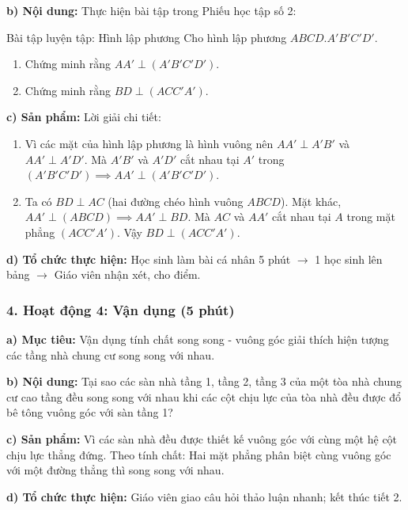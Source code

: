 \documentclass[12pt, a4paper]{article}
\begin{document}
\noindent \textbf{b) Nội dung:}
Thực hiện bài tập trong Phiếu học tập số 2:
\begin{pedabox}{Bài tập luyện tập: Hình lập phương}
Cho hình lập phương $ABCD.A'B'C'D'$.
\begin{enumerate}[leftmargin=0.6cm]
    \item Chứng minh rằng $AA' \perp (A'B'C'D')$.
    \item Chứng minh rằng $BD \perp (ACC'A')$.
\end{enumerate}
\end{pedabox}

\noindent \textbf{c) Sản phẩm:}
Lời giải chi tiết:
\begin{enumerate}[leftmargin=0.6cm]
    \item Vì các mặt của hình lập phương là hình vuông nên $AA' \perp A'B'$ và $AA' \perp A'D'$. Mà $A'B'$ và $A'D'$ cắt nhau tại $A'$ trong $(A'B'C'D') \implies AA' \perp (A'B'C'D')$.
    \item Ta có $BD \perp AC$ (hai đường chéo hình vuông $ABCD$).
    Mặt khác, $AA' \perp (ABCD) \implies AA' \perp BD$.
    Mà $AC$ và $AA'$ cắt nhau tại $A$ trong mặt phẳng $(ACC'A')$.
    Vậy $BD \perp (ACC'A')$.
\end{enumerate}

\noindent \textbf{d) Tổ chức thực hiện:}
Học sinh làm bài cá nhân 5 phút $\to$ 1 học sinh lên bảng $\to$ Giáo viên nhận xét, cho điểm.

\subsubsection*{4. Hoạt động 4: Vận dụng (5 phút)}

\noindent \textbf{a) Mục tiêu:}
Vận dụng tính chất song song - vuông góc giải thích hiện tượng các tầng nhà chung cư song song với nhau.

\noindent \textbf{b) Nội dung:}
Tại sao các sàn nhà tầng 1, tầng 2, tầng 3 của một tòa nhà chung cư cao tầng đều song song với nhau khi các cột chịu lực của tòa nhà đều được đổ bê tông vuông góc với sàn tầng 1?

\noindent \textbf{c) Sản phẩm:}
Vì các sàn nhà đều được thiết kế vuông góc với cùng một hệ cột chịu lực thẳng đứng. Theo tính chất: Hai mặt phẳng phân biệt cùng vuông góc với một đường thẳng thì song song với nhau.

\noindent \textbf{d) Tổ chức thực hiện:}
Giáo viên giao câu hỏi thảo luận nhanh; kết thúc tiết 2.

\vspace{10pt}
\end{document}
